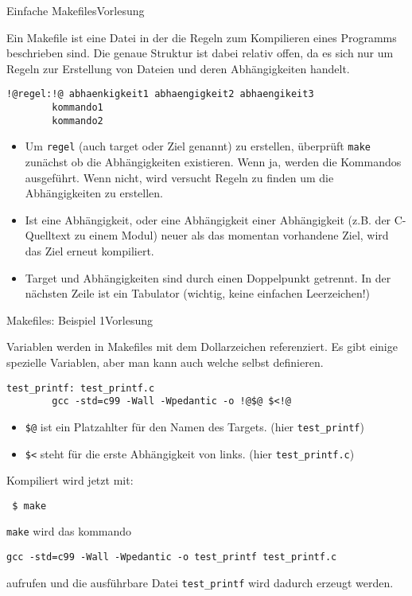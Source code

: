 \documentclass[xcolor=dvipsnames]{beamer}
\newcounter{lecturecounter}
\begin{document}
\begin{frame}[fragile]{Einfache Makefiles}{Vorlesung }
\begin{block}{}
Ein Makefile ist eine Datei in der die Regeln zum Kompilieren eines Programms beschrieben sind. Die genaue Struktur ist dabei relativ offen, da es sich nur um Regeln zur Erstellung von Dateien und deren Abhängigkeiten handelt.
\end{block}
\begin{lstlisting}[basicstyle=\ttfamily\scriptsize]
!@regel:!@ abhaenkigkeit1 abhaengigkeit2 abhaengikeit3
        kommando1
        kommando2
\end{lstlisting}
\begin{itemize}
  \item{Um \verb|regel| (auch target oder Ziel genannt) zu erstellen, überprüft \verb|make| zunächst ob die Abhängigkeiten existieren. Wenn ja, werden die Kommandos ausgeführt. Wenn nicht, wird versucht Regeln zu finden um die Abhängigkeiten zu erstellen.}
  \item{Ist eine Abhängigkeit, oder eine Abhängigkeit einer Abhängigkeit (z.B. der C-Quelltext zu einem Modul) neuer als das momentan vorhandene Ziel, wird das Ziel erneut kompiliert.}
  \item{Target und Abhängigkeiten sind durch einen Doppelpunkt getrennt. In der nächsten Zeile ist ein Tabulator (wichtig, keine einfachen Leerzeichen!)}
\end{itemize}
\end{frame}

\begin{frame}[fragile]{Makefiles: Beispiel 1}{Vorlesung }
\begin{block}{}
  Variablen werden in Makefiles mit dem Dollarzeichen referenziert. Es gibt einige spezielle Variablen, aber man kann auch welche selbst definieren.
\end{block}
\begin{lstlisting}[basicstyle=\ttfamily\scriptsize]
test_printf: test_printf.c
        gcc -std=c99 -Wall -Wpedantic -o !@$@ $<!@
\end{lstlisting}
\begin{block}{}
\begin{itemize}
  \item{\verb|$@| ist ein Platzahlter für den Namen des Targets. (hier \verb|test_printf|)}
  \item{\verb|$<| steht für die erste Abhängigkeit von links. (hier \verb|test_printf.c|)}
\end{itemize}
Kompiliert wird jetzt mit:
\begin{verbatim}
 $ make
\end{verbatim}
\verb|make| wird das kommando
\begin{verbatim}
gcc -std=c99 -Wall -Wpedantic -o test_printf test_printf.c
\end{verbatim}
aufrufen und die ausführbare Datei \verb|test_printf| wird dadurch erzeugt werden.
\end{block}
\end{frame}
\end{document}

